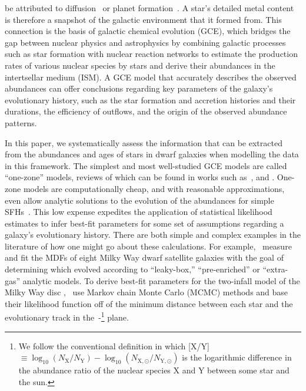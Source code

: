 \documentclass[ms.tex]{subfiles}
\begin{document}
be attributed to diffusion~\citep{BertelliMotta2018, Liu2019, Souto2019} or
planet formation~\citep{Melendez2009, Liu2016a, Spina2018}.
A star's detailed metal content is therefore a snapshot of the galactic
environment that it formed from.
This connection is the basis of galactic chemical evolution (GCE), which
bridges the gap between nuclear physics and astrophysics by combining galactic
processes such as star formation with nuclear reaction networks to estimate the
production rates of various nuclear species by stars and derive their
abundances in the intertsellar medium (ISM).
A GCE model that accurately describes the observed abundances can offer
conclusions regarding key parameters of the galaxy's evolutionary history, such
as the star formation and accretion histories and their durations, the
efficiency of outflows, and the origin of the observed abundance patterns.
\par
In this paper, we systematically assess the information that can be extracted
from the abundances and ages of stars in dwarf galaxies when modelling the
data in this framework.
The simplest and most well-studied GCE models are called ``one-zone'' models,
reviews of which can be found in works such as~\citet{Tinsley1980},
\citet{Pagel2009} and \citet{Matteucci2012, Matteucci2021}.
One-zone models are computationally cheap, and with reasonable approximations,
even allow analytic solutions to the evolution of the abundances for simple
SFHs~\citep*[e.g.,][]{Weinberg2017}.
This low expense expedites the application of statistical likelihood estimates
to infer best-fit parameters for some set of assumptions regarding a galaxy's
evolutionary history.
There are both simple and complex examples in the literature of how one might
go about these calculations.
For example,~\citet{Kirby2011} measure and fit the MDFs of eight Milky Way
dwarf satellite galaxies with the goal of determining which evolved according
to ``leaky-box,'' ``pre-enriched'' or ``extra-gas'' analytic models.
To derive best-fit parameters for the two-infall model of the Milky Way disc
\citep[e.g.,][]{Chiappini1997},~\citet{Spitoni2020, Spitoni2021} use Markov
chain Monte Carlo (MCMC) methods and base their likelihood function off of the
minimum distance between each star and the evolutionary track in
the~\afe-\feh\footnote{
	We follow the conventional definition in which
	[X/Y]~$\equiv \log_{10}(N_\text{X} / N_\text{Y}) -
	\log_{10}(N_{\text{X},\odot} / N_{\text{Y},\odot})$
	is the logarithmic difference in the abundance ratio of the nuclear species
	X and Y between some star and the sun.
} plane.
\end{document}
